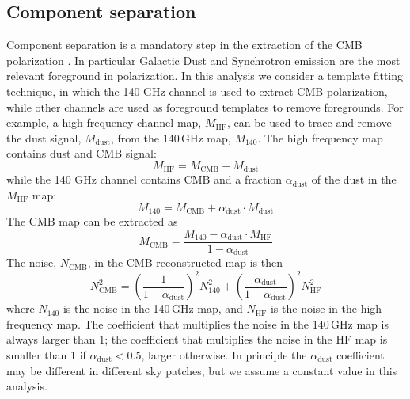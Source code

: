 \subsection{Component separation}
Component separation is a mandatory step in the extraction of the CMB polarization 
\citep[see e.g.][]{buzzelli_migliaccio2018}. In particular Galactic Dust and Synchrotron 
emission are the most relevant foreground in polarization. 
In this analysis we consider a template fitting technique, in which the 140 GHz channel
is used to extract CMB polarization, while other channels are used as 
foreground templates to remove foregrounds.
For example, a high frequency channel map, $M_\text{HF}$, can be used 
to trace and remove the dust signal, $M_\text{dust}$, from the 
140\,GHz map, $M_\text{140}$.   
The high frequency map contains dust and CMB signal:
\begin{equation} 
M_\text{HF} = M_\text{CMB} + M_\text{dust}
\end{equation}
while the 140 GHz channel contains CMB and a fraction $\alpha_\text{dust}$ of
the dust in the $M_\text{HF}$ map:
\begin{equation} 
M_\text{140} = M_\text{CMB} + \alpha_\text{dust} \cdot M_\text{dust}
\end{equation}
The CMB map can be extracted as
\begin{equation} 
M_\text{CMB} = \frac{M_\text{140} - \alpha_\text{dust} \cdot M_\text{HF}}{1-\alpha_\text{dust}}
\end{equation}
The noise, $N_\text{CMB}$, in the CMB reconstructed map is then
\begin{equation}
N_\text{CMB}^2 = \left( \frac{1}{1-\alpha_\text{dust}} \right)^2 N_\text{140}^2 + \left( \frac{\alpha_\text{dust}}{1-\alpha_\text{dust}} \right)^2 N_\text{HF}^2
\end{equation}
where $N_\text{140}$ is the noise in the 140\,GHz map, and $N_\text{HF}$ is the noise in the high 
frequency map. 
The coefficient that multiplies the noise in the 140\,GHz map is always larger than 1;
the coefficient that multiplies the noise in the HF map is smaller than 1 if $\alpha_\text{dust} < 0.5$, 
larger otherwise. 
In principle the $\alpha_\text{dust}$ coefficient may be different in different sky patches, but 
we assume a constant value in this analysis. 
\\
\\
 \\

